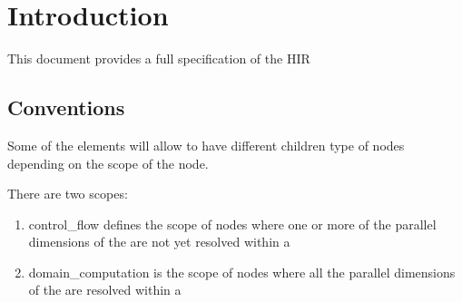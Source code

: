 \section{Introduction}


This document provides a full specification of the HIR

\subsection{Conventions}

Some of the elements will allow to have different children type of nodes depending on the scope of the node.

There are two scopes: 
\begin{enumerate}
	\item control\_flow defines the scope of nodes where one or more of the parallel dimensions of the  are not yet resolved within a 
	\item domain\_computation is the scope of nodes where all the parallel dimensions of the  are resolved within a 
\end{enumerate}